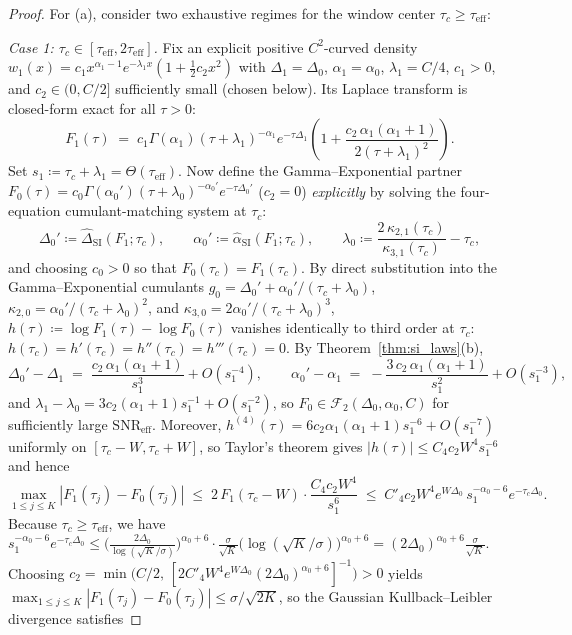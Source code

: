 \documentclass[11pt,a4paper]{article}
\theoremstyle{definition}
\begin{document}
\begin{proof}
For (a), consider two exhaustive regimes for the window center $\tau_c \ge \tau_{\mathrm{eff}}$:

\emph{Case 1: $\tau_c \in [\tau_{\mathrm{eff}}, 2\tau_{\mathrm{eff}}]$.} Fix an explicit positive $C^2$-curved density $w_1(x) = c_1 x^{\alpha_1 - 1} e^{-\lambda_1 x}(1 + \frac{1}{2} c_2 x^2)$ with $\Delta_1 = \Delta_0$, $\alpha_1 = \alpha_0$, $\lambda_1 = C/4$, $c_1 > 0$, and $c_2 \in (0, C/2]$ sufficiently small (chosen below). Its Laplace transform is closed-form exact for all $\tau > 0$:
\[
  F_1(\tau) \;=\; c_1 \Gamma(\alpha_1) (\tau + \lambda_1)^{-\alpha_1} e^{-\tau \Delta_1}
  \left(1 + \frac{c_2\, \alpha_1(\alpha_1 + 1)}{2 (\tau + \lambda_1)^2}\right).
\]
Set $s_1 \coloneqq \tau_c + \lambda_1 = \Theta(\tau_{\mathrm{eff}})$. Now define the Gamma--Exponential partner $F_0(\tau) = c_0 \Gamma(\alpha_0') (\tau + \lambda_0)^{-\alpha_0'} e^{-\tau \Delta_0'}$ ($c_2 = 0$) \emph{explicitly} by solving the four-equation cumulant-matching system at $\tau_c$:
\[
  \Delta_0' \coloneqq \widehat{\Delta}_{\mathrm{SI}}(F_1; \tau_c), \qquad
  \alpha_0' \coloneqq \widehat{\alpha}_{\mathrm{SI}}(F_1; \tau_c), \qquad
  \lambda_0 \coloneqq \frac{2\,\kappa_{2,1}(\tau_c)}{\kappa_{3,1}(\tau_c)} - \tau_c,
\]
and choosing $c_0 > 0$ so that $F_0(\tau_c) = F_1(\tau_c)$. By direct substitution into the Gamma--Exponential cumulants $g_0 = \Delta_0' + \alpha_0'/(\tau_c+\lambda_0)$, $\kappa_{2,0} = \alpha_0'/(\tau_c+\lambda_0)^2$, and $\kappa_{3,0} = 2\alpha_0'/(\tau_c+\lambda_0)^3$, $h(\tau) \coloneqq \log F_1(\tau) - \log F_0(\tau)$ vanishes identically to third order at $\tau_c$: $h(\tau_c) = h'(\tau_c) = h''(\tau_c) = h'''(\tau_c) = 0$. By Theorem~\ref{thm:si_laws}(b),
\[
  \Delta_0' - \Delta_1 \;=\; \frac{c_2\,\alpha_1(\alpha_1+1)}{s_1^3} + O(s_1^{-4}), \qquad
  \alpha_0' - \alpha_1 \;=\; -\frac{3\, c_2\,\alpha_1(\alpha_1+1)}{s_1^2} + O(s_1^{-3}),
\]
and $\lambda_1 - \lambda_0 = 3 c_2 (\alpha_1 + 1) s_1^{-1} + O(s_1^{-2})$, so $F_0 \in \mathcal{F}_2(\Delta_0, \alpha_0, C)$ for sufficiently large $\mathrm{SNR}_{\mathrm{eff}}$. Moreover, $h^{(4)}(\tau) = 6 c_2 \alpha_1(\alpha_1+1) s_1^{-6} + O(s_1^{-7})$ uniformly on $[\tau_c - W, \tau_c + W]$, so Taylor's theorem gives $|h(\tau)| \le C_4 c_2 W^4 s_1^{-6}$ and hence
\[
  \max_{1 \le j \le K} |F_1(\tau_j) - F_0(\tau_j)|
  \;\le\; 2\, F_1(\tau_c - W) \cdot \frac{C_4 c_2 W^4}{s_1^6}
  \;\le\; C'_4 c_2 W^4 e^{W\Delta_0}\, s_1^{-\alpha_0 - 6} e^{-\tau_c \Delta_0}.
\]
Because $\tau_c \ge \tau_{\mathrm{eff}}$, we have $s_1^{-\alpha_0 - 6} e^{-\tau_c \Delta_0} \le \bigl(\frac{2\Delta_0}{\log(\sqrt{K}/\sigma)}\bigr)^{\alpha_0 + 6} \cdot \frac{\sigma}{\sqrt{K}}\bigl(\log(\sqrt{K}/\sigma)\bigr)^{\alpha_0 + 6} = (2\Delta_0)^{\alpha_0 + 6} \frac{\sigma}{\sqrt{K}}$. Choosing $c_2 = \min\bigl(C/2,\, [2 C'_4 W^4 e^{W\Delta_0} (2\Delta_0)^{\alpha_0+6}]^{-1}\bigr) > 0$ yields $\max_{1 \le j \le K} |F_1(\tau_j) - F_0(\tau_j)| \le \sigma / \sqrt{2K}$, so the Gaussian Kullback--Leibler divergence satisfies

\end{proof}
\end{document}
